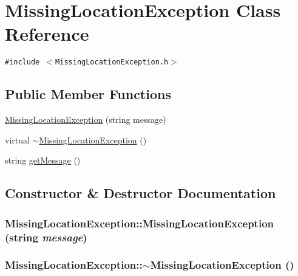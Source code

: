 \hypertarget{class_missing_location_exception}{
\section{Missing\-Location\-Exception Class Reference}
\label{class_missing_location_exception}
}
{\tt \#include $<$Missing\-Location\-Exception.h$>$}

\subsection*{Public Member Functions}
\begin{CompactItemize}
\item 
\hyperlink{class_missing_location_exception_d7af861342f2e17d18a08d302187db8b}{Missing\-Location\-Exception} (string message)
\item 
virtual \hyperlink{class_missing_location_exception_94b992eb7227b7923acd746a7d4b5f86}{$\sim$Missing\-Location\-Exception} ()
\item 
string \hyperlink{class_missing_location_exception_d3115ba6a009eec3cfb9fdc7af4c7fdb}{get\-Message} ()
\end{CompactItemize}


\subsection{Constructor \& Destructor Documentation}
\hypertarget{class_missing_location_exception_d7af861342f2e17d18a08d302187db8b}{
\subsubsection[MissingLocationException]{\setlength{\rightskip}{0pt plus 5cm}Missing\-Location\-Exception::Missing\-Location\-Exception (string {\em message})}}
\label{class_missing_location_exception_d7af861342f2e17d18a08d302187db8b}


\hypertarget{class_missing_location_exception_94b992eb7227b7923acd746a7d4b5f86}{
\subsubsection[$\sim$MissingLocationException]{\setlength{\rightskip}{0pt plus 5cm}Missing\-Location\-Exception::$\sim$Missing\-Location\-Exception ()}}
\label{class_missing_location_exception_94b992eb7227b7923acd746a7d4b5f86}




